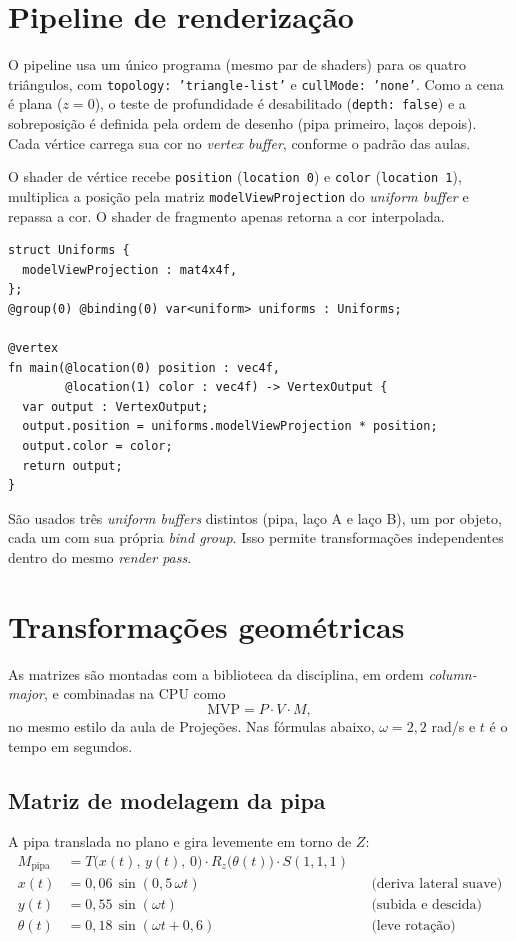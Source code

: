 \documentclass[11pt,a4paper]{article}
\newcommand{\code}[1]{\texttt{#1}}
\begin{document}
\section{Pipeline de renderização}

O pipeline usa um único programa (mesmo par de shaders) para os quatro
triângulos, com \code{topology: 'triangle-list'} e \code{cullMode: 'none'}.
Como a cena é plana ($z=0$), o teste de profundidade é desabilitado
(\code{depth: false}) e a sobreposição é definida pela ordem de desenho (pipa
primeiro, laços depois). Cada vértice carrega sua cor no \emph{vertex buffer},
conforme o padrão das aulas.

O shader de vértice recebe \code{position} (\code{location 0}) e \code{color}
(\code{location 1}), multiplica a posição pela matriz
\code{modelViewProjection} do \emph{uniform buffer} e repassa a cor. O shader
de fragmento apenas retorna a cor interpolada.

\begin{lstlisting}
struct Uniforms {
  modelViewProjection : mat4x4f,
};
@group(0) @binding(0) var<uniform> uniforms : Uniforms;

@vertex
fn main(@location(0) position : vec4f,
        @location(1) color : vec4f) -> VertexOutput {
  var output : VertexOutput;
  output.position = uniforms.modelViewProjection * position;
  output.color = color;
  return output;
}
\end{lstlisting}

São usados três \emph{uniform buffers} distintos (pipa, laço A e laço B), um
por objeto, cada um com sua própria \emph{bind group}. Isso permite
transformações independentes dentro do mesmo \emph{render pass}.

\section{Transformações geométricas}

As matrizes são montadas com a biblioteca da disciplina, em ordem
\emph{column-major}, e combinadas na CPU como
\[
    \mathrm{MVP} = P \cdot V \cdot M,
\]
no mesmo estilo da aula de Projeções. Nas fórmulas abaixo,
$\omega = 2{,}2$ rad/s e $t$ é o tempo em segundos.

\subsection{Matriz de modelagem da pipa}

A pipa translada no plano e gira levemente em torno de $Z$:
\begin{align*}
    M_{\text{pipa}} &= T\big(x(t),\, y(t),\, 0\big)\cdot R_z\big(\theta(t)\big)\cdot S(1,1,1)\\[2pt]
    x(t)      &= 0{,}06\,\sin(0{,}5\,\omega t) && \text{(deriva lateral suave)}\\
    y(t)      &= 0{,}55\,\sin(\omega t)        && \text{(subida e descida)}\\
    \theta(t) &= 0{,}18\,\sin(\omega t + 0{,}6) && \text{(leve rotação)}
\end{align*}
\end{document}
